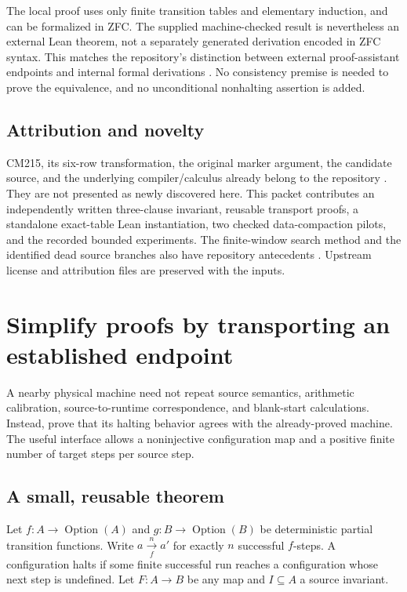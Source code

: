 \documentclass[11pt]{article}
\begin{document}
The local proof uses only finite transition tables and elementary induction, and can be formalized in ZFC. The supplied machine-checked result is nevertheless an external Lean theorem, not a separately generated derivation encoded in ZFC syntax. This matches the repository's distinction between external proof-assistant endpoints and internal formal derivations \cite{formal,phase3}. No consistency premise is needed to prove the equivalence, and no unconditional nonhalting assertion is added.

\subsection{Attribution and novelty}

CM215, its six-row transformation, the original marker argument, the candidate source, and the underlying compiler/calculus already belong to the repository \cite{marker}. They are not presented as newly discovered here. This packet contributes an independently written three-clause invariant, reusable transport proofs, a standalone exact-table Lean instantiation, two checked data-compaction pilots, and the recorded bounded experiments. The finite-window search method and the identified dead source branches also have repository antecedents \cite{priorsearch}. Upstream license and attribution files are preserved with the inputs.

\section{Simplify proofs by transporting an established endpoint}

A nearby physical machine need not repeat source semantics, arithmetic calibration, source-to-runtime correspondence, and blank-start calculations. Instead, prove that its halting behavior agrees with the already-proved machine. The useful interface allows a noninjective configuration map and a positive finite number of target steps per source step.

\subsection{A small, reusable theorem}

Let $f:A\to\operatorname{Option}(A)$ and $g:B\to\operatorname{Option}(B)$ be deterministic partial transition functions. Write $a\xrightarrow[f]{n}a'$ for exactly $n$ successful $f$-steps. A configuration halts if some finite successful run reaches a configuration whose next step is undefined. Let $F:A\to B$ be any map and $I\subseteq A$ a source invariant.
\end{document}
